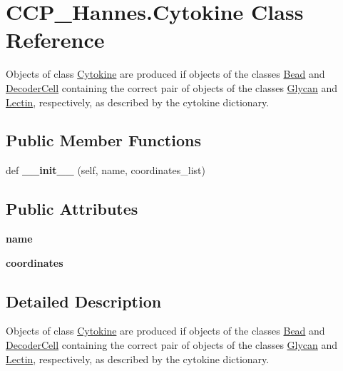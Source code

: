 \hypertarget{class_c_c_p___hannes_1_1_cytokine}{}\section{C\+C\+P\+\_\+\+Hannes.\+Cytokine Class Reference}
\label{class_c_c_p___hannes_1_1_cytokine}


Objects of class \mbox{\hyperlink{class_c_c_p___hannes_1_1_cytokine}{Cytokine}} are produced if objects of the classes \mbox{\hyperlink{class_c_c_p___hannes_1_1_bead}{Bead}} and \mbox{\hyperlink{class_c_c_p___hannes_1_1_decoder_cell}{Decoder\+Cell}} containing the correct pair of objects of the classes \mbox{\hyperlink{class_c_c_p___hannes_1_1_glycan}{Glycan}} and \mbox{\hyperlink{class_c_c_p___hannes_1_1_lectin}{Lectin}}, respectively, as described by the cytokine dictionary.  


\subsection*{Public Member Functions}
\begin{DoxyCompactItemize}
\item 
\mbox{\label{class_c_c_p___hannes_1_1_cytokine_af2434b23dd11be1d5d1f9bdf25925295}} 
def {\bfseries \+\_\+\+\_\+init\+\_\+\+\_\+} (self, name, coordinates\+\_\+list)
\end{DoxyCompactItemize}
\subsection*{Public Attributes}
\begin{DoxyCompactItemize}
\item 
\mbox{\label{class_c_c_p___hannes_1_1_cytokine_af16e4d4ac0aaacc26bb3547e2380a700}} 
{\bfseries name}
\item 
\mbox{\label{class_c_c_p___hannes_1_1_cytokine_aaa4faecbee6a5b485e0a704c1c93a8d6}} 
{\bfseries coordinates}
\end{DoxyCompactItemize}


\subsection{Detailed Description}
Objects of class \mbox{\hyperlink{class_c_c_p___hannes_1_1_cytokine}{Cytokine}} are produced if objects of the classes \mbox{\hyperlink{class_c_c_p___hannes_1_1_bead}{Bead}} and \mbox{\hyperlink{class_c_c_p___hannes_1_1_decoder_cell}{Decoder\+Cell}} containing the correct pair of objects of the classes \mbox{\hyperlink{class_c_c_p___hannes_1_1_glycan}{Glycan}} and \mbox{\hyperlink{class_c_c_p___hannes_1_1_lectin}{Lectin}}, respectively, as described by the cytokine dictionary. 


